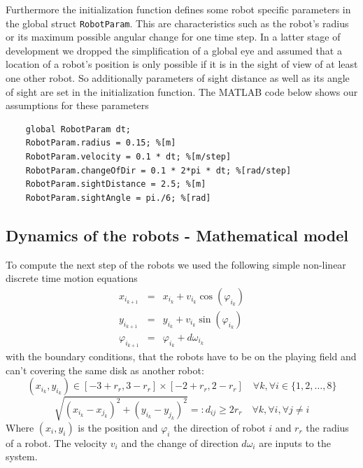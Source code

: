 Furthermore the initialization function defines some robot specific parameters in the global struct \texttt{RobotParam}. This are characteristics such as the robot's radius or its maximum possible angular change for one time step. In a latter stage of development we dropped the simplification of a global eye and assumed that a location of a robot's position is only possible if it is in the sight of view of at least one other robot. So additionally parameters of sight distance as well as its angle of sight are set in the initialization function. The MATLAB code below shows our assumptions for these parameters
\begin{lstlisting}
    global RobotParam dt;
    RobotParam.radius = 0.15; %[m]
    RobotParam.velocity = 0.1 * dt; %[m/step]
    RobotParam.changeOfDir = 0.1 * 2*pi * dt; %[rad/step]
    RobotParam.sightDistance = 2.5; %[m]
    RobotParam.sightAngle = pi./6; %[rad]
\end{lstlisting}
  
\subsection*{Dynamics of the robots - Mathematical model}
To compute the next step of the robots we used the following simple non-linear discrete time motion equations
\begin{eqnarray}
	x_{i_{k+1}} &=& x_{i_{k}} + v_{i_{k}} \cos(\varphi_{i_{k}}) 	\label{robot_motion_first} \\
	y_{i_{k+1}} &=& y_{i_{k}} + v_{i_{k}} \sin(\varphi_{i_{k}}) \\
	\varphi_{i_{k+1}} &=& \varphi_{i_{k}} + d\omega_{i_k}
	\label{robot_motion_last}
\end{eqnarray}
with the boundary conditions, that the robots have to be on the playing field and can't covering the same disk as another robot:
	\[ (x_{i_{k}},y_{i_{k}}) \in [-3+r_r,3-r_r]\times[-2+r_r,2-r_r] \quad \forall k, \forall i\in \{1,2,\ldots,8 \}
	\]
	\[ \sqrt{(x_{i_{k}}-x_{j_{k}})^2 + (y_{i_{k}}-y_{j_{k}})^2} =: d_{ij} \geq 2r_r \quad \forall k, \forall i, \forall j\neq i
	\]
Where $(x_i,y_i)$ is the position and $\varphi_i$ the direction of robot $i$ and $r_r$ the radius of a robot. The velocity $v_i$ and the change of direction $d\omega_i$ are inputs to the system.


